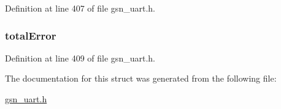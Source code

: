 Definition at line 407 of file gsn\_\-uart.h.

\hypertarget{a00265_a02af367c24288030c3d38a1c4c9fb09a}{
\subsubsection[{totalError}]{ {\bf totalError}}}
\label{a00265_a02af367c24288030c3d38a1c4c9fb09a}


Definition at line 409 of file gsn\_\-uart.h.



The documentation for this struct was generated from the following file:\begin{DoxyCompactItemize}
\item 
\hyperlink{a00600}{gsn\_\-uart.h}\end{DoxyCompactItemize}
